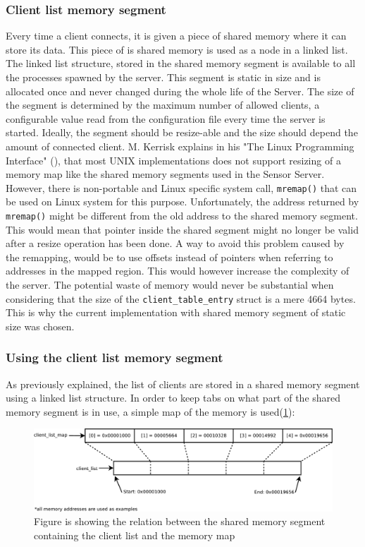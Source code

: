 \documentclass[12pt,english,a4paper]{report}
\begin{document}
\subsubsection{Client list memory segment}
Every time a client connects, it is given a piece of shared memory where it can store its data. This piece of is shared memory is used as a node in a linked list. The linked list structure, stored in the shared memory segment is available to all the processes spawned by the server. This segment is static in size and is allocated once and never changed during the whole life of the Server. The size of the segment is determined by the maximum number of allowed clients, a configurable value read from the configuration file every time the server is started. Ideally, the segment should be resize-able and the size should depend the amount of connected client. M. Kerrisk explains in his "The Linux Programming Interface" (\cite{kerrisk2010linux}), that most UNIX implementations does not support resizing of a memory map like the shared memory segments used in the Sensor Server. However, there is non-portable and Linux specific system call, \texttt{mremap()} that can be used on Linux system for this purpose. Unfortunately, the address returned by \texttt{mremap()} might be different from the old address to the shared memory segment. This would mean that pointer inside the shared segment might no longer be valid after a resize operation has been done. A way to avoid this problem caused by the remapping, would be to use offsets instead of pointers when referring to addresses in the mapped region. This would however increase the complexity of the server. The potential waste of memory would never be substantial when considering that the size of the \texttt{client\_table\_entry} struct is a mere 4664 bytes. This is why the current implementation with shared memory segment of static size was chosen.

\subsubsection{Using the client list memory segment}\label{create_client}
As previously explained, the list of clients are stored in a shared memory segment using a linked list structure. In order to keep tabs on what part of the shared memory segment is in use, a simple map of the memory is used(\ref{memory_map_figure}):
\begin{figure}
\centering
  \includegraphics[scale=0.3]{mem_layout}
   \caption[Memory map layout example]{Figure is showing the relation between the shared memory segment containing the client list and the memory map}
   \label{memory_map_figure}
\end{figure} 
\end{document}
